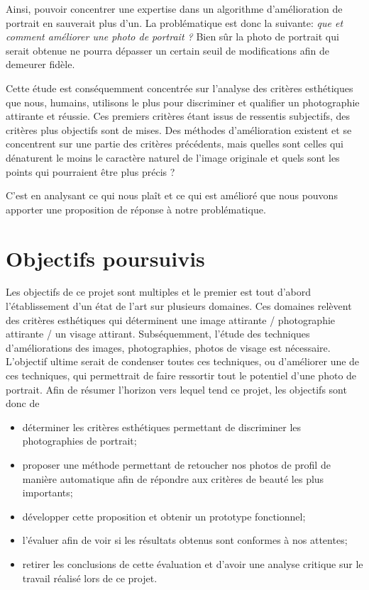 \documentclass[11pt, french]{report-rd-info}
\begin{document}
Ainsi, pouvoir concentrer une expertise dans un algorithme d'amélioration de portrait en sauverait plus d'un. La problématique est donc la suivante: \emph{que et comment améliorer une photo de portrait ?} Bien sûr la photo de portrait qui serait obtenue ne pourra dépasser un certain seuil de modifications afin de demeurer fidèle.

Cette étude est conséquemment concentrée sur l'analyse des critères esthétiques que nous, humains, utilisons le plus pour discriminer et qualifier un photographie attirante et réussie. Ces premiers critères étant issus de ressentis subjectifs, des critères plus objectifs sont de mises.
Des méthodes d'amélioration existent et se concentrent sur une partie des critères précédents, mais quelles sont celles qui dénaturent le moins le caractère naturel de l'image originale et quels sont les points qui pourraient être plus précis ?

C'est en analysant ce qui nous plaît et ce qui est amélioré que nous pouvons apporter une proposition de réponse à notre problématique.
\section{Objectifs poursuivis}
Les objectifs de ce projet sont multiples et le premier est tout d'abord l'établissement d'un état de l'art sur plusieurs domaines. Ces domaines relèvent des critères esthétiques qui déterminent une image attirante / photographie attirante / un visage attirant. Subséquemment, l'étude des techniques d'améliorations des images, photographies, photos de visage est nécessaire. L'objectif ultime serait de condenser toutes ces techniques, ou d'améliorer une de ces techniques, qui permettrait de faire ressortir tout le potentiel d'une photo de portrait. Afin de résumer l'horizon vers lequel tend ce projet, les objectifs sont donc de
\begin{itemize}
\item déterminer les critères esthétiques permettant de discriminer les photographies de portrait;
\item proposer une méthode permettant de retoucher nos photos de profil de manière automatique afin de répondre aux critères de beauté les plus importants;
\item développer cette proposition et obtenir un prototype fonctionnel;
\item l'évaluer afin de voir si les résultats obtenus sont conformes à nos attentes;
\item retirer les conclusions de cette évaluation et d'avoir une analyse critique sur le travail réalisé lors de ce projet.
\end{itemize}
\end{document}
